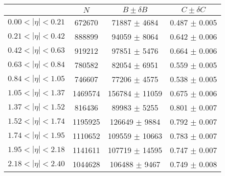 \begin{tabular}{lccc}
\hline
    &   $N$   & $B \pm \delta B$  &  $C \pm \delta C$ \\
\hline
$0.00 < |\eta| <0.21$          & 672670     & 71887      $\pm$ 4684 & 0.487      $\pm$ 0.005 \\
$0.21 < |\eta| <0.42$          & 888899     & 94059      $\pm$ 8064 & 0.642      $\pm$ 0.006 \\
$0.42 < |\eta| <0.63$          & 919212     & 97851      $\pm$ 5476 & 0.664      $\pm$ 0.006 \\
$0.63 < |\eta| <0.84$          & 780582     & 82054      $\pm$ 6951 & 0.559      $\pm$ 0.005 \\
$0.84 < |\eta| <1.05$          & 746607     & 77206      $\pm$ 4575 & 0.538      $\pm$ 0.005 \\
$1.05 < |\eta| <1.37$          & 1469574    & 156784     $\pm$ 11059 & 0.675      $\pm$ 0.006 \\
$1.37 < |\eta| <1.52$          & 816436     & 89983      $\pm$ 5255 & 0.801      $\pm$ 0.007 \\
$1.52 < |\eta| <1.74$          & 1195925    & 126649     $\pm$ 9884 & 0.792      $\pm$ 0.007 \\
$1.74 < |\eta| <1.95$          & 1110652    & 109559     $\pm$ 10663 & 0.783      $\pm$ 0.007 \\
$1.95 < |\eta| <2.18$          & 1141611    & 107719     $\pm$ 14595 & 0.747      $\pm$ 0.007 \\
$2.18 < |\eta| <2.40$          & 1044628    & 106488     $\pm$ 9467 & 0.749      $\pm$ 0.008 \\
\hline
\end{tabular}
